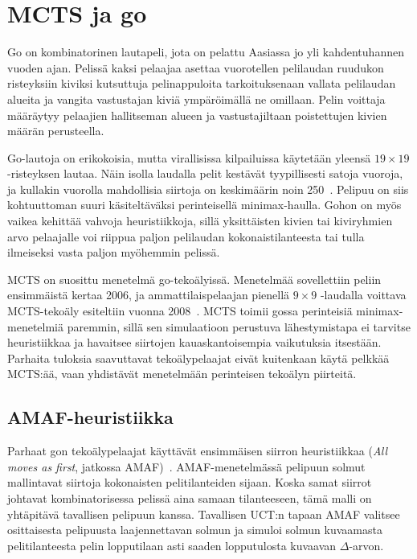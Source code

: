 \documentclass[12pt,finnish]{tktltiki2}
\theoremstyle{definition}
\theoremstyle{remark}
\begin{document}
\section{MCTS ja go}

Go on kombinatorinen lautapeli, jota on pelattu Aasiassa jo yli kahdentuhannen vuoden ajan. Pelissä kaksi pelaajaa asettaa vuorotellen pelilaudan ruudukon risteyksiin kiviksi kutsuttuja pelinappuloita tarkoituksenaan vallata pelilaudan alueita ja vangita vastustajan kiviä ympäröimällä ne omillaan. Pelin voittaja määräytyy pelaajien hallitseman alueen ja vastustajiltaan poistettujen kivien määrän perusteella.

Go-lautoja on erikokoisia, mutta virallisissa kilpailuissa käytetään yleensä $19 \times 19$ -risteyksen lautaa. Näin isolla laudalla pelit kestävät tyypillisesti satoja vuoroja, ja kullakin vuorolla mahdollisia siirtoja on keskimäärin noin 250~\cite{browne}. Pelipuu on siis kohtuuttoman suuri käsiteltäväksi perinteisellä minimax-haulla. Gohon on myös vaikea kehittää vahvoja heuristiikkoja, sillä yksittäisten kivien tai kiviryhmien arvo pelaajalle voi riippua paljon pelilaudan kokonaistilanteesta tai tulla ilmeiseksi vasta paljon myöhemmin pelissä.

MCTS on suosittu menetelmä go-tekoälyissä. Menetelmää sovellettiin peliin ensimmäistä kertaa 2006, ja ammattilaispelaajan pienellä $9 \times 9$ -laudalla voittava MCTS-tekoäly esiteltiin vuonna 2008~\cite{browne}. MCTS toimii gossa perinteisiä minimax-menetelmiä paremmin, sillä sen simulaatioon perustuva lähestymistapa ei tarvitse heuristiikkaa ja havaitsee siirtojen kauaskantoisempia vaikutuksia itsestään. Parhaita tuloksia saavuttavat tekoälypelaajat eivät kuitenkaan käytä pelkkää MCTS:ää, vaan yhdistävät menetelmään perinteisen tekoälyn piirteitä.

\subsection{AMAF-heuristiikka}

Parhaat gon tekoälypelaajat käyttävät ensimmäisen siirron heuristiikkaa (\textit{All moves as first}, jatkossa AMAF)~\cite{browne}. AMAF-menetelmässä pelipuun solmut mallintavat siirtoja kokonaisten pelitilanteiden sijaan. Koska samat siirrot johtavat kombinatorisessa pelissä aina samaan tilanteeseen, tämä malli on yhtäpitävä tavallisen pelipuun kanssa. Tavallisen UCT:n tapaan AMAF valitsee osittaisesta pelipuusta laajennettavan solmun ja simuloi solmun kuvaamasta pelitilanteesta pelin lopputilaan asti saaden lopputulosta kuvaavan $\Delta$-arvon.
\end{document}
